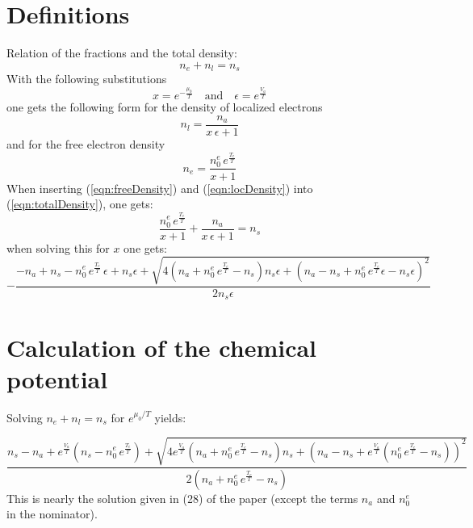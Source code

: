 \documentclass[a4paper,11pt]{article}
\newcommand{\eqref}[1]{(\ref{#1})}
\begin{document}
\section{Definitions}
Relation of the fractions and the total density:
\begin{equation}
	\label{eqn:totalDensity}
	n_e+n_l=n_s
\end{equation}
With the following substitutions
\begin{equation}
	\label{eqn:substitutions}
	x=e^{-\frac{\mu_0}{T}}\quad\mathrm{and}\quad\epsilon=e^{\frac{V_a}{T}}
\end{equation}
one gets the following form for the density of localized electrons
\begin{equation}
	\label{eqn:locDensity}
	n_l=\frac{n_a}{x\,\epsilon+1}
\end{equation}
and for the free electron density
\begin{equation}
	\label{eqn:freeDensity}
	n_e=\frac{n_0^e\,e^{\frac{T_e}{T}}}{x+1}
\end{equation}
When inserting \eqref{eqn:freeDensity} and \eqref{eqn:locDensity} into \eqref{eqn:totalDensity}, one gets:
\begin{equation}
	\frac{n_0^e\,e^{\frac{T_e}{T}}}{x+1}+\frac{n_a}{x\,\epsilon+1}=n_s
\end{equation}
when solving this for $x$ one gets:
\begin{equation}
-\frac{-n_a + n_s - n^e_0\,e^{\frac{T_e}{T}}\, \epsilon  + n_s\epsilon  + {\sqrt{4 \left(n_a + n^e_0\,e^{\frac{T_e}{T}} - n_s \right) n_s\epsilon  + {\left(n_a - n_s + n^e_0\,e^{\frac{T_e}{T}}\epsilon  - n_s\epsilon  \right) }^2}}}{2n_s\epsilon }
\end{equation}

\section{Calculation of the chemical potential}

Solving $n_e+n_l=n_s$ for $e^{\mu_0/T}$ yields:

\begin{equation}
\frac{n_s -n_a + e^{\frac{V_a}{T}}\left(n_s - n_0^e\,e^{\frac{T_e}{T}}\right) + {\sqrt{4e^{\frac{V_a}{T}}\left(n_a + n_0^e\,e^{\frac{T_e}{T}} - n_s \right) n_s + {\left(n_a - n_s + e^{\frac{V_a}{ T}}\left( n_0^e\,e^{\frac{T_e}{T}} -  n_s\right) \right) }^2}}}{2\left(n_a + n_0^e\,e^{\frac{T_e}{T}} - n_s \right)}
\end{equation}
This is nearly the solution given in (28) of the paper (except the terms $n_a$ and $n_0^e$ in the nominator).
\end{document}
